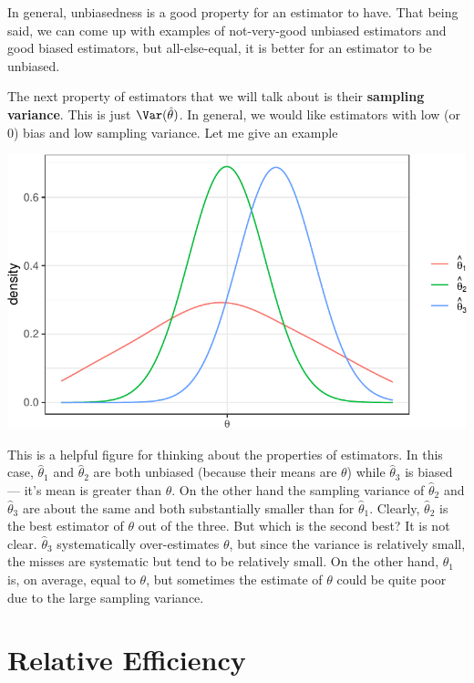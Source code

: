\documentclass[
  letterpaper,
  DIV=11,
  numbers=noendperiod]{scrreprt}
\begin{document}
In general, unbiasedness is a good property for an estimator to have.
That being said, we can come up with examples of not-very-good unbiased
estimators and good biased estimators, but all-else-equal, it is better
for an estimator to be unbiased.

The next property of estimators that we will talk about is their
\textbf{sampling variance}. This is just \(\Var(\hat{\theta})\). In
general, we would like estimators with low (or 0) bias and low sampling
variance. Let me give an example

\includegraphics{05-finite_sample_properties_files/figure-pdf/unnamed-chunk-2-1.pdf}

This is a helpful figure for thinking about the properties of
estimators. In this case, \(\hat{\theta}_1\) and \(\hat{\theta}_2\) are
both unbiased (because their means are \(\theta\)) while
\(\hat{\theta}_3\) is biased --- it's mean is greater than \(\theta\).
On the other hand the sampling variance of \(\hat{\theta}_2\) and
\(\hat{\theta}_3\) are about the same and both substantially smaller
than for \(\hat{\theta}_1\). Clearly, \(\hat{\theta}_2\) is the best
estimator of \(\theta\) out of the three. But which is the second best?
It is not clear. \(\hat{\theta}_3\) systematically over-estimates
\(\theta\), but since the variance is relatively small, the misses are
systematic but tend to be relatively small. On the other hand,
\(\hat{\theta}_1\) is, on average, equal to \(\theta\), but sometimes
the estimate of \(\theta\) could be quite poor due to the large sampling
variance.

\section{Relative Efficiency}\label{relative-efficiency}
\end{document}
